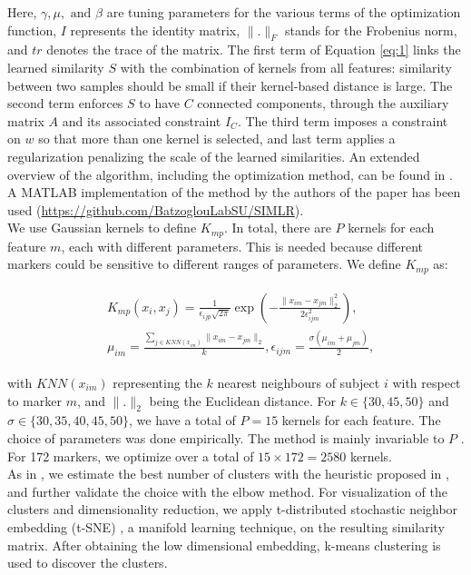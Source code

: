 Here, $\gamma, \mu, \text{ and } \beta$ are tuning parameters for the various terms of the optimization function, $I$ represents the identity matrix, $\| . \|_F$ stands for the Frobenius norm, and $tr$ denotes the trace of the matrix. The first term of Equation \ref{eq:1} links the learned similarity $S$ with the combination of kernels from all features: similarity between two samples should be small if their kernel-based distance is large. The second term enforces $S$ to have $C$ connected components, through the auxiliary matrix $A$ and its associated constraint $I_C$. The third term imposes a constraint on $w$ so that more than one kernel is selected, and last term applies a regularization penalizing the scale of the learned similarities. An extended overview of the algorithm, including the optimization method, can be found in \cite{Ramazzotti2018}. A MATLAB implementation of the method by the authors of the paper has been used  (\url{https://github.com/BatzoglouLabSU/SIMLR}). \\


We use Gaussian kernels to define $K_{mp}$. In total, there are $P$ kernels for each feature $m$, each with different parameters. This is needed because different markers could be sensitive to different ranges of parameters. We define $K_{mp}$ as:

\begin{align}
\begin{split}\label{eq:2}
{}&K_{mp}(x_i,x_j) = \frac{1}{\epsilon_{ijp}\sqrt{2\pi}} \exp \left( -\frac{\| x_{im} - x_{jm} \|^2_2}{2\epsilon_{ijm}^2}  \right), \\
{}&\mu_{im} = \frac{\sum_{j \in KNN(x_{im})} \| x_{im} - x_{jm} \|_2}{k}, \epsilon_{ijm}=\frac{\sigma(\mu_{im} + \mu_{jm})}{2},
\end{split}
\end{align}

with $KNN(x_{im})$ representing the $k$ nearest neighbours of subject $i$ with respect to marker $m$, and $\| .\|_2$ being the Euclidean distance. For $k\in \{30,45,50\}$ and $\sigma \in \{30,35,40,45,50\}$, we have a total of $P=15$ kernels for each feature. The choice of parameters was done empirically. The method is mainly invariable to $P$ \cite{Wang2017a}. For 172 markers, we optimize over a total of $15\times 172=2580$ kernels. \\

As in \cite{Ramazzotti2018}, we estimate the best number of clusters with the heuristic proposed in \cite{Zelnik-Manor}, and further validate the choice with the elbow method. For visualization of the clusters and dimensionality reduction, we apply t-distributed stochastic neighbor embedding (t-SNE) \cite{VanDerMaaten2008}, a manifold learning technique, on the resulting similarity matrix. After obtaining the low dimensional embedding, k-means clustering is used to discover the clusters. \\

